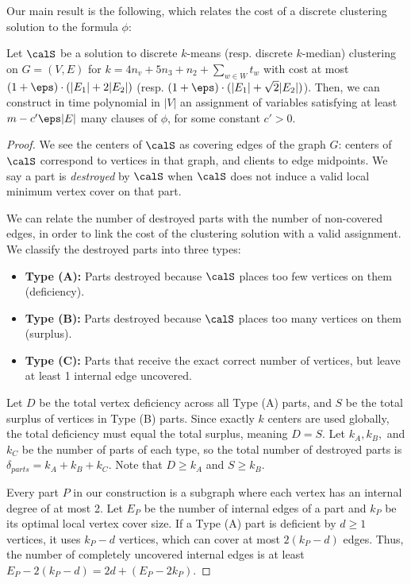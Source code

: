 Our main result is the following, which relates the cost of a discrete clustering solution to the formula $\phi$:
\begin{lemma}\label{lem:decodeD}
Let $\calS$ be a solution to discrete $k$-means (resp. discrete $k$-median) clustering on $G=(V, E)$ for $k = 4n_v + 5n_3 + n_2 + \sum_{w \in W} t_w$ with cost at most $(1+\eps)\cdot (|E_1| + 2|E_2|)$ (resp. $(1+\eps)\cdot (|E_1| + \sqrt{2}|E_2|)$). Then, we can construct in time polynomial in $|V|$ an assignment of variables satisfying at least $m - c'\eps|E|$ many clauses of $\phi$, for some constant $c' > 0$.
\end{lemma}
\begin{proof}
We see the centers of $\calS$ as covering edges of the graph $G$: centers of $\calS$ correspond to vertices in that graph, and clients to edge midpoints.
We say a part is \emph{destroyed} by $\calS$ when $\calS$ does not induce a valid local minimum vertex cover on that part. 

We can relate the number of destroyed parts with the number of non-covered edges, in order to link the cost of the clustering solution with a valid assignment. We classify the destroyed parts into three types:
\begin{itemize}
    \item \textbf{Type (A):} Parts destroyed because $\calS$ places too few vertices on them (deficiency).
    \item \textbf{Type (B):} Parts destroyed because $\calS$ places too many vertices on them (surplus).
    \item \textbf{Type (C):} Parts that receive the exact correct number of vertices, but leave at least 1 internal edge uncovered.
\end{itemize}

Let $D$ be the total vertex deficiency across all Type (A) parts, and $S$ be the total surplus of vertices in Type (B) parts. Since exactly $k$ centers are used globally, the total deficiency must equal the total surplus, meaning $D = S$. Let $k_A, k_B,$ and $k_C$ be the number of parts of each type, so the total number of destroyed parts is $\delta_{parts} = k_A + k_B + k_C$. Note that $D \ge k_A$ and $S \ge k_B$.


Every part $P$ in our construction is a subgraph where each vertex has an internal degree of at most 2. Let $E_P$ be the number of internal edges of a part and $k_P$ be its optimal local vertex cover size. If a Type (A) part is deficient by $d \ge 1$ vertices, it uses $k_P - d$ vertices, which can cover at most $2(k_P - d)$ edges. Thus, the number of completely uncovered internal edges is at least $E_P - 2(k_P - d) = 2d + (E_P - 2k_P)$. 


\end{proof}
